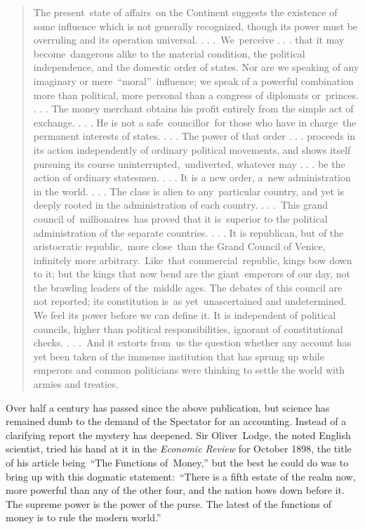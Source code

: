 \documentclass[openany,nobib]{tufte-book}
\begin{document}
\begin{quote}
The present~state of affairs~on the Continent suggests the existence of
some influence which is not generally recognized, though its power must
be overruling and its operation universal. . . .~We~perceive . . . that
it may become~dangerous alike to the material condition, the political
independence, and the domestic order of states. Nor are we speaking of
any imaginary or mere~``moral''~influence; we speak of a powerful
combination more than political, more personal than a congress of
diplomats or~princes. . . . The money merchant obtains his profit
entirely from the simple act of exchange. . . . He is not a
safe~councillor~for those who have in charge~the permanent interests of
states. . . . The power of that order . . . proceeds in its action
independently of ordinary political movements, and shows itself pursuing
its course uninterrupted,~undiverted, whatever may . . . be the action
of ordinary statesmen. . . . It is a new order, a~new administration in
the world. . . . The class is alien to any~particular country, and yet
is deeply rooted in the administration of each country. . . .~This grand
council of~millionaires~has proved that it is~superior to the political
administration of the separate countries. . . . It is republican, but of
the aristocratic republic,~more close~than the Grand Council of Venice,
infinitely more arbitrary.~Like~that commercial~republic, kings bow down
to it; but the kings that now bend are the giant~emperors of our day,
not the brawling leaders of the~middle ages. The debates of this council
are not reported; its constitution is~as yet~unascertained and
undetermined. We feel its power before we can define it. It is
independent of political councils, higher than political
responsibilities, ignorant of constitutional checks. . . .~And it
extorts from~us the question whether any account has yet been taken of
the immense institution that has sprung up while emperors and common
politicians were thinking to settle the world with armies and treaties.
\end{quote}
\enlargethispage{\baselineskip}
Over half a century has passed since the above publication, but science
has remained dumb to the demand of the Spectator for an accounting.
Instead of a clarifying report the mystery has deepened. Sir
Oliver~Lodge, the noted English scientist, tried his hand at it in the
\emph{Economic Review} for October 1898, the title of his article
being~``The Functions of~Money,'' but the best he could do was to bring
up with this dogmatic statement:~``There is a fifth estate of the realm
now, more powerful than any of the other four, and the nation bows down
before it. The supreme power is the power of the purse. The latest of
the functions of money is to rule the modern world.''~
\end{document}

